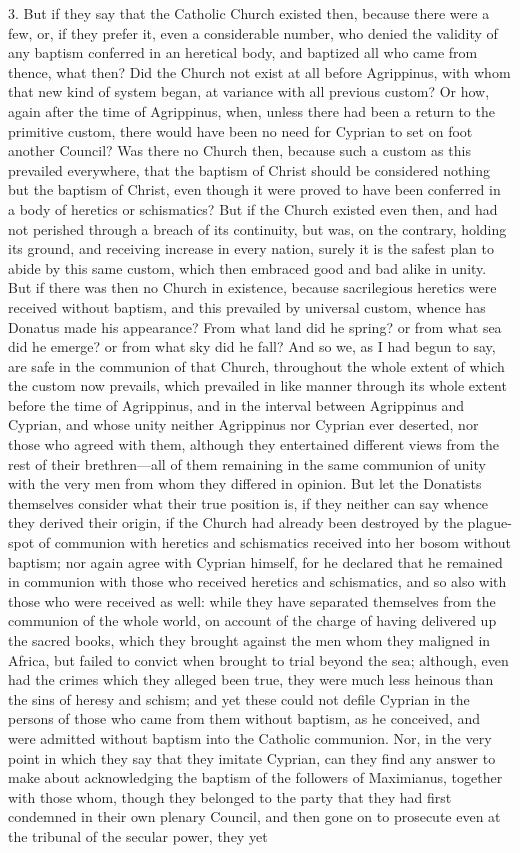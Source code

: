 3. But if they say that the Catholic Church existed then, because there were a few, or, if they prefer it, even a considerable number, who denied the validity of any baptism conferred in an heretical body, and baptized all who came from thence, what then? Did the Church not exist at all before Agrippinus, with whom that new kind of system began, at variance with all previous custom? Or how, again after the time of Agrippinus, when, unless there had been a return to the primitive custom, there would have been no need for Cyprian to set on foot another Council? Was there no Church then, because such a custom as this prevailed everywhere, that the baptism of Christ should be considered nothing but the baptism of Christ, even though it were proved to have been conferred in a body of heretics or schismatics? But if the Church existed even then, and had not perished through a breach of its continuity, but was, on the contrary, holding its ground, and receiving increase in every nation, surely it is the safest plan to abide by this same custom, which then embraced good and bad alike in unity. But if there was then no Church in existence, because sacrilegious heretics were received without baptism, and this prevailed by universal custom, whence has Donatus made his appearance? From what land did he spring? or from what sea did he emerge? or from what sky did he fall? And so we, as I had begun to say, are safe in the communion of that Church, throughout the whole extent of which the custom now prevails, which prevailed in like manner through its whole extent before the time of Agrippinus, and in the interval between Agrippinus and Cyprian, and whose unity neither Agrippinus nor Cyprian ever deserted, nor those who agreed with them, although they entertained different views from the rest of their brethren—all of them remaining in the same communion of unity with the very men from whom they differed in opinion. But let the Donatists themselves consider what their true position is, if they neither can say whence they derived their origin, if the Church had already been destroyed by the plague-spot of communion with heretics and schismatics received into her bosom without baptism; nor again agree with Cyprian himself, for he declared that he remained in communion with those who received heretics and schismatics, and so also with those who were received as well: while they have separated themselves from the communion of the whole world, on account of the charge of having delivered up the sacred books, which they brought against the men whom they maligned in Africa, but failed to convict when brought to trial beyond the sea; although, even had the crimes which they alleged been true, they were much less heinous than the sins of heresy and schism; and yet these could not defile Cyprian in the persons of those who came from them without baptism, as he conceived, and were admitted without baptism into the Catholic communion. Nor, in the very point in which they say that they imitate Cyprian, can they find any answer to make about acknowledging the baptism of the followers of Maximianus, together with those whom, though they belonged to the party that they had first condemned in their own plenary Council, and then gone on to prosecute even at the tribunal of the secular power, they yet 